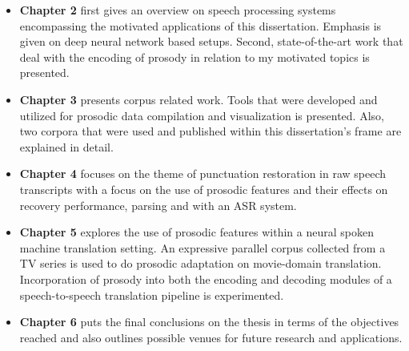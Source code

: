 \begin{itemize}
    \item \textbf{Chapter 2} first gives an overview on speech processing systems encompassing the motivated applications of this dissertation. Emphasis is given on deep neural network based setups. Second, state-of-the-art work that deal with the encoding of prosody in relation to my motivated topics is presented. 
    \item \textbf{Chapter 3} presents corpus related work. Tools that were developed and utilized for prosodic data compilation and visualization is presented. Also, two corpora that were used and published within this dissertation's frame are explained in detail. 
    \item \textbf{Chapter 4} focuses on the theme of punctuation restoration in raw speech transcripts with a focus on the use of prosodic features and their effects on recovery performance, parsing and with an ASR system. 
    \item \textbf{Chapter 5} explores the use of prosodic features within a neural spoken machine translation setting. An expressive parallel corpus collected from a TV series is used to do prosodic adaptation on movie-domain translation. Incorporation of prosody into both the encoding and decoding modules of a speech-to-speech translation pipeline is experimented.
    \item \textbf{Chapter 6} puts the final conclusions on the thesis in terms of the objectives reached and also outlines possible venues for future research and applications. 
\end{itemize}


